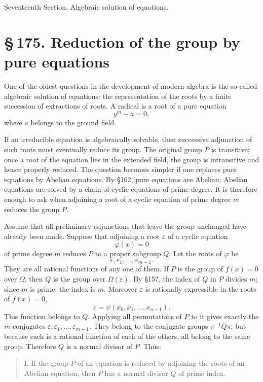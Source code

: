 \documentclass[11pt]{article}
\providecommand{\sect}[2]{\section*{\S\,#1. #2}}
\begin{document}
\begin{center}\large Seventeenth Section. Algebraic solution of equations.\end{center}

\sect{175}{Reduction of the group by pure equations}

One of the oldest questions in the development of modern algebra is the so-called algebraic solution of equations: the representation of the roots by a finite succession of extractions of roots. A radical is a root of a pure equation
\[
        y^m-a=0,                                                        \tag{1}
\]
where $a$ belongs to the ground field.

If an irreducible equation is algebraically solvable, then successive adjunction of such roots must eventually reduce its group. The original group $P$ is transitive; once a root of the equation lies in the extended field, the group is intransitive and hence properly reduced. The question becomes simpler if one replaces pure equations by Abelian equations. By §162, pure equations are Abelian; Abelian equations are solved by a chain of cyclic equations of prime degree. It is therefore enough to ask when adjoining a root of a cyclic equation of prime degree $m$ reduces the group $P$.

Assume that all preliminary adjunctions that leave the group unchanged have already been made. Suppose that adjoining a root $\varepsilon$ of a cyclic equation
\[
        \varphi(x)=0
\]
of prime degree $m$ reduces $P$ to a proper subgroup $Q$. Let the roots of $\varphi$ be
\[
        \varepsilon,
\varepsilon_1,
\ldots,
\varepsilon_{m-1}.
\]
They are all rational functions of any one of them. If $P$ is the group of $f(x)=0$ over $\Omega$, then $Q$ is the group over $\Omega(\varepsilon)$. By §157, the index of $Q$ in $P$ divides $m$; since $m$ is prime, the index is $m$. Moreover $\varepsilon$ is rationally expressible in the roots of $f(x)=0$,
\[
        \varepsilon=\psi(x_0,x_1,
\ldots,x_{n-1}).                       \tag{2}
\]
This function belongs to $Q$. Applying all permutations of $P$ to it gives exactly the $m$ conjugates $\varepsilon,
\varepsilon_1,
\ldots,
\varepsilon_{m-1}$. They belong to the conjugate groups $\pi^{-1}Q\pi$; but because each is a rational function of each of the others, all belong to the same group. Therefore $Q$ is a normal divisor of $P$. Thus:

\begin{quote}
I. If the group $P$ of an equation is reduced by adjoining the roots of an Abelian equation, then $P$ has a normal divisor $Q$ of prime index.
\end{quote}
\end{document}

